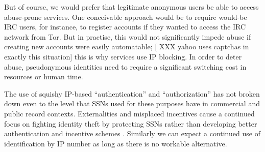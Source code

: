 \documentclass{llncs}
\newenvironment{tightlist}{\begin{list}{$\bullet$}{
  \setlength{\itemsep}{0mm}
    \setlength{\parsep}{0mm}
    }}{\end{list}}
\begin{document}
But of course, we would prefer that legitimate anonymous users be able to
access abuse-prone services.  One conceivable approach would be to require
would-be IRC users, for instance, to register accounts if they wanted to
access the IRC network from Tor.  But in practise, this would not
significantly impede abuse if creating new accounts were easily automatable;
[ XXX yahoo uses captchas in exactly this situation]
this is why services use IP blocking.  In order to deter abuse, pseudonymous
identities need to require a significant switching cost in resources or human
time.


The use of squishy IP-based ``authentication'' and ``authorization''
has not broken down even to the level that SSNs used for these
purposes have in commercial and public record contexts. Externalities
and misplaced incentives cause a continued focus on fighting identity
theft by protecting SSNs rather than developing better authentication
and incentive schemes \cite{price-privacy}. Similarly we can expect a
continued use of identification by IP number as long as there is no
workable alternative.
\end{document}
